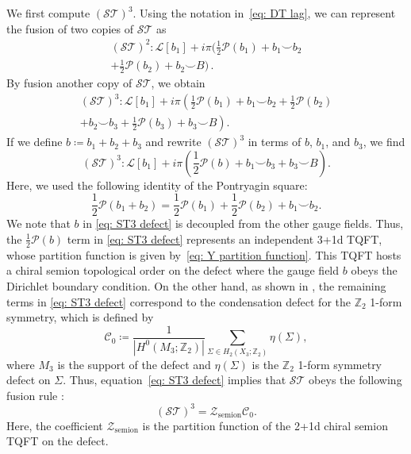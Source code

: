 \documentclass[aps,twocolumn,prx,floatfix,preprintnumbers, nofootinbib,10pt]{revtex4-2}
\numberwithin{equation}{section}
\theoremstyle{definition}
\theoremstyle{remark}
\theoremstyle{claim}
\begin{document}
\vspace*{\baselineskip}
We first compute $(\mathcal{ST})^3$.
Using the notation in~\eqref{eq: DT lag}, we can represent the fusion of two copies of $\mathcal{ST}$ as
\begin{multline}
 (\mathcal{ST})^2: \mathcal{L}[b_1] + i\pi \bigg( \frac{1}{2} \mathcal{P}(b_1) + b_1 \smile b_2 \\
 + \frac{1}{2} \mathcal{P}(b_2) + b_2 \smile B \bigg) \,.
\end{multline}
By fusion another copy of $\mathcal{ST}$, we obtain
\begin{multline}
 (\mathcal{ST})^3 : \mathcal{L}[b_1] + i\pi \left( \frac{1}{2} \mathcal{P}(b_1) + b_1 \smile b_2 + \frac{1}{2} \mathcal{P}(b_2) \right. \\ 
 \left. + b_2 \smile b_3 + \frac{1}{2} \mathcal{P}(b_3) + b_3 \smile B \right).
\end{multline}
If we define $b \coloneq b_1 + b_2 + b_3$ and rewrite $(\mathcal{ST})^3$ in terms of $b$, $b_1$, and $b_3$, we find
\begin{equation}
(\mathcal{ST})^3: \mathcal{L}[b_1] + i\pi \left( \frac{1}{2} \mathcal{P}(b) + b_1 \smile b_3 + b_3 \smile B \right).
\label{eq: ST3 defect}
\end{equation}
Here, we used the following identity of the Pontryagin square:
\begin{equation}
\frac{1}{2}\mathcal{P}(b_1+b_2) = \frac{1}{2} \mathcal{P}(b_1) + \frac{1}{2} \mathcal{P}(b_2) + b_1 \smile b_2.
\end{equation}
We note that $b$ in \eqref{eq: ST3 defect} is decoupled from the other gauge fields.
Thus, the $\frac{1}{2} \mathcal{P}(b)$ term in \eqref{eq: ST3 defect} represents an independent 3+1d TQFT, whose partition function is given by~\eqref{eq: Y partition function}.
This TQFT hosts a chiral semion topological order on the defect where the gauge field $b$ obeys the Dirichlet boundary condition.
On the other hand, as shown in \cite{Choi:2022zal}, the remaining terms in \eqref{eq: ST3 defect} correspond to the condensation defect for the $\mathbb{Z}_2$ 1-form symmetry, 
which is defined by \cite{Roumpedakis:2022aik, Choi:2022zal}
\begin{equation}
\mathcal{C}_0 \coloneq \frac{1}{|H^0(M_3; \mathbb{Z}_2)|} \sum_{\Sigma \in H_2(X_3; \mathbb{Z}_2)} \eta(\Sigma),
\label{eq: condensation Z2}
\end{equation}
where $M_3$ is the support of the defect and $\eta(\Sigma)$ is the $\mathbb{Z}_2$ 1-form symmetry defect on $\Sigma$. 
Thus, equation~\eqref{eq: ST3 defect} implies that $\mathcal{ST}$ obeys the following fusion rule \cite{Choi:2022zal}:
\begin{equation}
(\mathcal{ST})^3 = \mathcal{Z}_{\mathrm{semion}} \mathcal{C}_0.
\label{eq: ST3 continuum defect}
\end{equation}
Here, the coefficient $\mathcal{Z}_{\mathrm{semion}}$ is the partition function of the 2+1d chiral semion TQFT on the defect.
\end{document}
